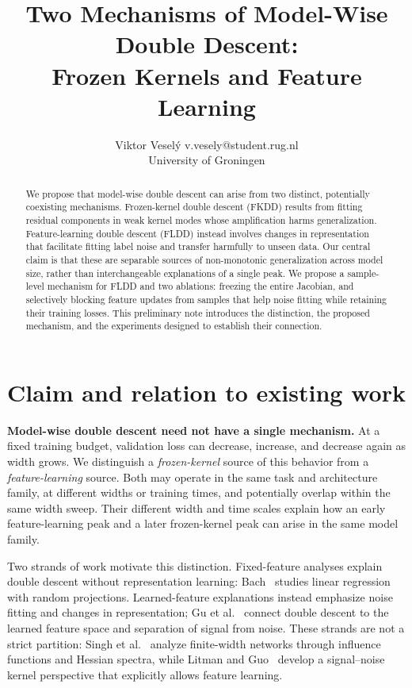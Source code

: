 \documentclass[10pt]{article}
\title{Two Mechanisms of Model-Wise Double Descent:\\Frozen Kernels and Feature Learning}
\author{\name Viktor Vesel\'{y} \email v.vesely@student.rug.nl \\
\addr University of Groningen}
\begin{document}
\maketitle
\begin{abstract}
We propose that model-wise double descent can arise from two distinct, potentially coexisting mechanisms. Frozen-kernel double descent (FKDD) results from fitting residual components in weak kernel modes whose amplification harms generalization. Feature-learning double descent (FLDD) instead involves changes in representation that facilitate fitting label noise and transfer harmfully to unseen data. Our central claim is that these are separable sources of non-monotonic generalization across model size, rather than interchangeable explanations of a single peak. We propose a sample-level mechanism for FLDD and two ablations: freezing the entire Jacobian, and selectively blocking feature updates from samples that help noise fitting while retaining their training losses. This preliminary note introduces the distinction, the proposed mechanism, and the experiments designed to establish their connection.
\end{abstract}

\section{Claim and relation to existing work}
\textbf{Model-wise double descent need not have a single mechanism.} At a fixed training budget, validation loss can decrease, increase, and decrease again as width grows. We distinguish a \emph{frozen-kernel} source of this behavior from a \emph{feature-learning} source. Both may operate in the same task and architecture family, at different widths or training times, and potentially overlap within the same width sweep. Their different width and time scales explain how an early feature-learning peak and a later frozen-kernel peak can arise in the same model family.

Two strands of work motivate this distinction. Fixed-feature analyses explain double descent without representation learning: Bach~\cite{bach2023highdimensionalanalysisdoubledescent} studies linear regression with random projections. Learned-feature explanations instead emphasize noise fitting and changes in representation; Gu et al.~\cite{gu2024unravelingenigmadoubledescent} connect double descent to the learned feature space and separation of signal from noise. These strands are not a strict partition: Singh et al.~\cite{singh2022phenomenologydoubledescentfinitewidth} analyze finite-width networks through influence functions and Hessian spectra, while Litman and Guo~\cite{litman2026theorygeneralizationdeeplearning} develop a signal--noise kernel perspective that explicitly allows feature learning.
\end{document}
